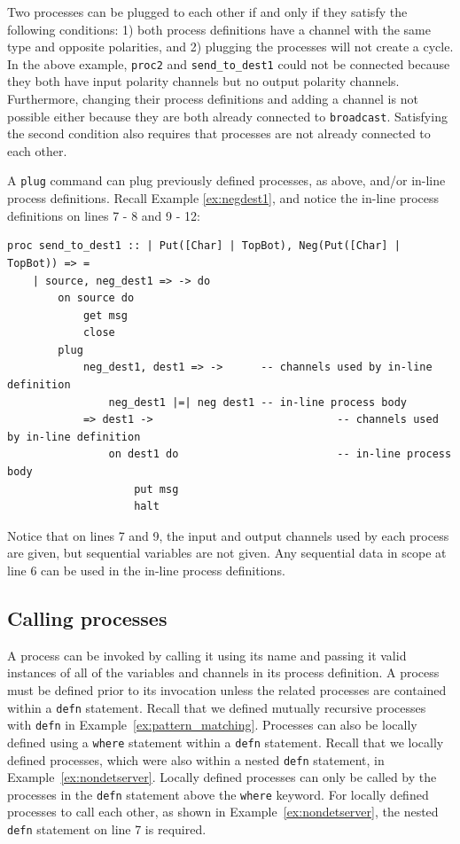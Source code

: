 \documentclass[acmsmall]{acmart}
\begin{document}
Two processes can be plugged to each other if and only if they satisfy the following conditions: 1) both process definitions have a channel with the same type and opposite polarities, and 2) plugging the processes will not create a cycle.
In the above example, \lstinline$proc2$ and \lstinline$send_to_dest1$ could not be connected because they both have input polarity channels but no output polarity channels.
Furthermore, changing their process definitions and adding a channel is not possible either because they are both already connected to \lstinline$broadcast$.
Satisfying the second condition also requires that processes are not already connected to each other.

A \lstinline$plug$ command can plug previously defined processes, as above, and/or in-line process definitions.
Recall Example \ref{ex:negdest1}, and notice the in-line process definitions on lines 7 - 8 and 9 - 12:
\begin{lstlisting}
proc send_to_dest1 :: | Put([Char] | TopBot), Neg(Put([Char] | TopBot)) => =
	| source, neg_dest1 => -> do
		on source do						
			get msg
			close
		plug
			neg_dest1, dest1 => -> 		-- channels used by in-line definition
				neg_dest1 |=| neg dest1 -- in-line process body
			=> dest1 -> 							-- channels used by in-line definition
				on dest1 do							-- in-line process body
					put msg
					halt
\end{lstlisting}
Notice that on lines 7 and 9, the input and output channels used by each process are given, but sequential variables are not given.
Any sequential data in scope at line 6 can be used in the in-line process definitions.

\subsection{Calling processes}
\label{sec:calling_procs}

A process can be invoked by calling it using its name and passing it valid instances of all of the variables and channels in its process definition.
A process must be defined prior to its invocation unless the related processes are contained within a \lstinline{defn} statement.
Recall that we defined mutually recursive processes with \lstinline{defn} in Example~\ref{ex:pattern_matching}.
Processes can also be locally defined using a \lstinline{where} statement within a \lstinline{defn} statement.
Recall that we locally defined processes, which were also within a nested \lstinline{defn} statement, in Example~\ref{ex:nondetserver}.
Locally defined processes can only be called by the processes in the \lstinline{defn} statement above the \lstinline{where} keyword.
For locally defined processes to call each other, as shown in Example~\ref{ex:nondetserver}, the nested \lstinline{defn} statement on line 7 is required.
\end{document}
